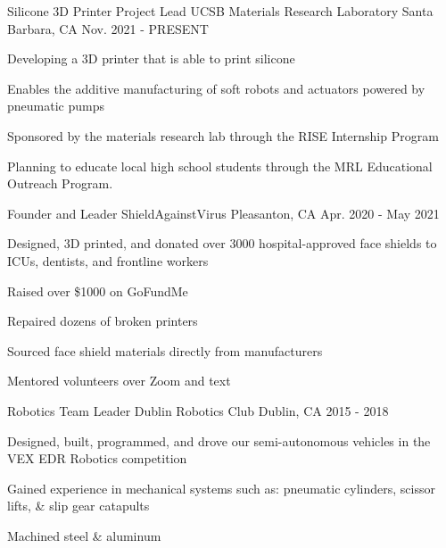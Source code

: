 \begin{cventries}
\cventry
{Silicone 3D Printer Project Lead} %
{UCSB Materials Research Laboratory} %
{Santa Barbara, CA} %
{Nov. 2021 - PRESENT} %
{ %
\begin{cvitems}
\item {Developing a 3D printer that is able to print silicone}
\item {Enables the additive manufacturing of soft robots and actuators powered by pneumatic pumps}
\item {Sponsored by the materials research lab through the RISE Internship Program}
\item {Planning to educate local high school students through the MRL Educational Outreach Program.}
\end{cvitems}
}



\cventry
{Founder and Leader} %
{ShieldAgainstVirus} %
{Pleasanton, CA} %
{Apr. 2020 - May 2021} %
{ %
\begin{cvitems}
\item {Designed, 3D printed, and donated over 3000 hospital-approved face shields to ICUs, dentists, and frontline workers}
\item {Raised over \$1000 on GoFundMe}
\item {Repaired dozens of broken printers}
\item {Sourced face shield materials directly from manufacturers}
\item {Mentored volunteers over Zoom and text}
\end{cvitems}
}




\cventry
{Robotics Team Leader} %
{Dublin Robotics Club} %
{Dublin, CA} %
{2015 - 2018} %
{ %
\begin{cvitems}
\item {Designed, built, programmed, and drove our semi-autonomous vehicles in the VEX EDR Robotics competition}
\item {Gained experience in mechanical systems such as: pneumatic cylinders, scissor lifts, \& slip gear catapults}
\item {Machined steel \& aluminum}
\end{cvitems}
}


\end{cventries}
